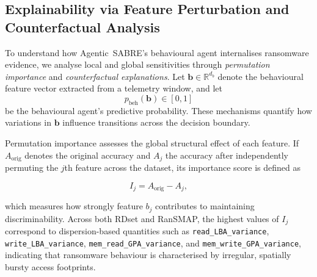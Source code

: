 \documentclass[3p]{elsarticle}
\begin{document}
\subsection{Explainability via Feature Perturbation and Counterfactual Analysis}
\label{sec:behavioural_explainability}

To understand how Agentic~SABRE’s behavioural agent internalises ransomware evidence, we analyse local and global sensitivities through \emph{permutation importance} and \emph{counterfactual explanations}. Let $\mathbf{b}\in\mathbb{R}^{d_b}$ denote the behavioural feature vector extracted from a telemetry window, and let
\begin{equation}
p_{\mathrm{beh}}(\mathbf{b}) \in [0,1]
\label{eq:beh_score}
\end{equation}
be the behavioural agent's predictive probability. These mechanisms quantify how variations in $\mathbf{b}$ influence transitions across the decision boundary.

Permutation importance assesses the global structural effect of each feature. If $A_{\text{orig}}$ denotes the original accuracy and $A_j$ the accuracy after independently permuting the $j$th feature across the dataset, its importance score is defined as

\begin{equation}
    I_j = A_{\text{orig}} - A_j ,
\label{eq:perm_imp}
\end{equation}

which measures how strongly feature $b_j$ contributes to maintaining discriminability. Across both RDset and RanSMAP, the highest values of $I_j$ correspond to dispersion-based quantities such as \texttt{read\_LBA\_variance}, \texttt{write\_LBA\_variance}, \texttt{mem\_read\_GPA\_variance}, and \texttt{mem\_write\_GPA\_variance}, indicating that ransomware behaviour is characterised by irregular, spatially bursty access footprints.
\end{document}
